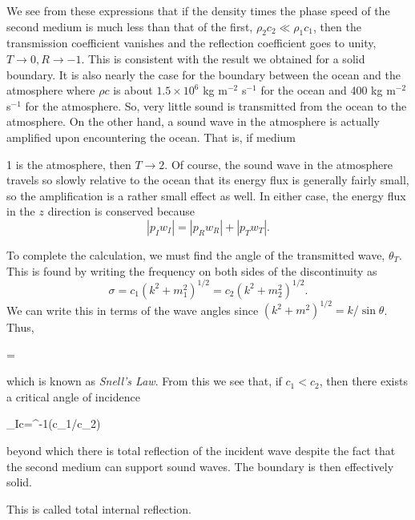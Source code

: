 We see from these expressions that if the density times the phase speed of the
second medium is much less than that of the first, $\rho_2c_2\ll\rho_1c_1$, then the transmission
coefficient vanishes and the reflection coefficient goes to unity, $T\to0,R\to-1$. This is
consistent with the result we obtained for a solid boundary. It is also nearly the case
for the boundary between the ocean and the atmosphere where $\rho c$ is about $1.5\times10^6$ kg
m$^{-2}$ s$^{-1}$ for the ocean and 400 kg m$^{-2}$ s$^{-1}$ for the atmosphere. So, very little sound is
transmitted from the ocean to the atmosphere. On the other hand, a sound wave in
the atmosphere is actually amplified upon encountering the ocean. That is, if medium

\sourcepagebreak

1 is the atmosphere, then $T\to2$. Of course, the sound wave in the atmosphere travels
so slowly relative to the ocean that its energy flux is generally fairly small, so the
amplification is a rather small effect as well. In either case, the energy flux in the $z$
direction is conserved because
\[
	|p_Iw_I|=|p_Rw_R|+|p_Tw_T|.
\]

To complete the calculation, we must find the angle of the transmitted wave, $\theta_T$.
This is found by writing the frequency on both sides of the discontinuity as
\[
	\sigma=c_1(k^2+m_1^2)^{1/2}=c_2(k^2+m_2^2)^{1/2}.
\]
We can write this in terms of the wave angles since $(k^2+m^2)^{1/2}=k/\sin\theta$. Thus,
\begin{waveequation}
	=
\end{waveequation}
which is known as \emph{Snell's Law}. From this we see that, if $c_1<c_2$, then there exists a
critical angle of incidence
\begin{waveequation}
	\theta_{Ic}=\sin^{-1}(c_1/c_2)
\end{waveequation}
beyond which there is total reflection of the incident wave despite the fact that the
second medium can support sound waves. The boundary is then effectively solid.


This is called total internal reflection.

